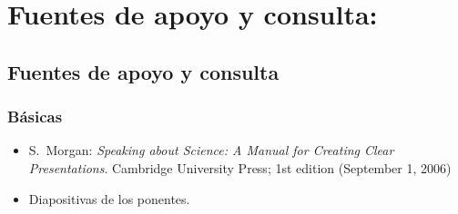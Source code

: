 \section{Fuentes de apoyo y consulta:}

\subsection{Fuentes de apoyo y consulta}

\subsubsection{B\'{a}sicas}

 \begin{itemize}[itemsep=0em]

 \item{S.\ {\sc Morgan}: {\em Speaking about Science: A Manual for
      Creating Clear Presentations}.
    Cambridge University Press; 1st edition (September 1, 2006)}

\item{Diapositivas de los ponentes.}
   
\end{itemize}



